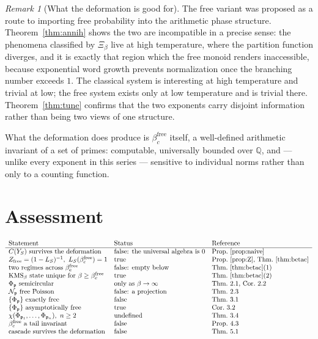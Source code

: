 \documentclass[11pt]{amsart}
\numberwithin{equation}{section}
\theoremstyle{definition}
\theoremstyle{remark}
\newtheorem{remark}[theorem]{Remark}
\newcommand{\Q}{\mathbb{Q}}
\newcommand{\cN}{\mathcal{N}}
\newcommand{\pp}{\mathfrak{p}}
\newcommand{\bfree}{\beta_c^{\mathrm{free}}}
\begin{document}
\begin{remark}[What the deformation is good for]\label{rem:moral}
The free variant was proposed as a route to importing free probability into the arithmetic
phase structure. Theorem~\ref{thm:annih} shows the two are incompatible in a precise sense:
the phenomena classified by $\Xi_\beta$ live at high temperature, where the partition
function diverges, and it is exactly that region which the free monoid renders inaccessible,
because exponential word growth prevents normalization once the branching number exceeds
$1$. The classical system is interesting at high temperature and trivial at low; the free
system exists only at low temperature and is trivial there. Theorem~\ref{thm:tune} confirms
that the two exponents carry disjoint information rather than being two views of one
structure.

What the deformation does produce is $\bfree$ itself, a well-defined arithmetic invariant of
a set of primes: computable, universally bounded over $\Q$, and --- unlike every exponent in
this series --- sensitive to individual norms rather than only to a counting function.
\end{remark}

\section{Assessment}

\[
\begin{array}{lll}
\text{Statement} & \text{Status} & \text{Reference}\\\hline
C(Y_S)\ \text{survives the deformation} & \text{false: the universal algebra is }0 & \text{Prop.~\ref{prop:naive}}\\
Z_{\mathrm{free}}=(1-L_S)^{-1},\ L_S(\bfree)=1 & \text{true} & \text{Prop.~\ref{prop:Z}, Thm.~\ref{thm:betac}}\\
\text{two regimes across }\bfree & \text{false: empty below} & \text{Thm.~\ref{thm:betac}(1)}\\
\text{KMS}_\beta\text{ state unique for }\beta\ge\bfree & \text{true} & \text{Thm.~\ref{thm:betac}(2)}\\
\Phi_\pp\ \text{semicircular} & \text{only as }\beta\to\infty & \text{Thm.~2.1, Cor.~2.2}\\
\cN_\pp\ \text{free Poisson} & \text{false: a projection} & \text{Thm.~2.3}\\
\{\Phi_\pp\}\ \text{exactly free} & \text{false} & \text{Thm.~3.1}\\
\{\Phi_\pp\}\ \text{asymptotically free} & \text{true} & \text{Cor.~3.2}\\
\chi(\Phi_{\pp_1},\dots,\Phi_{\pp_n}),\ n\ge2 & \text{undefined} & \text{Thm.~3.4}\\
\bfree\ \text{a tail invariant} & \text{false} & \text{Prop.~4.3}\\
\text{cascade survives the deformation} & \text{false} & \text{Thm.~5.1}
\end{array}
\]
\end{document}
